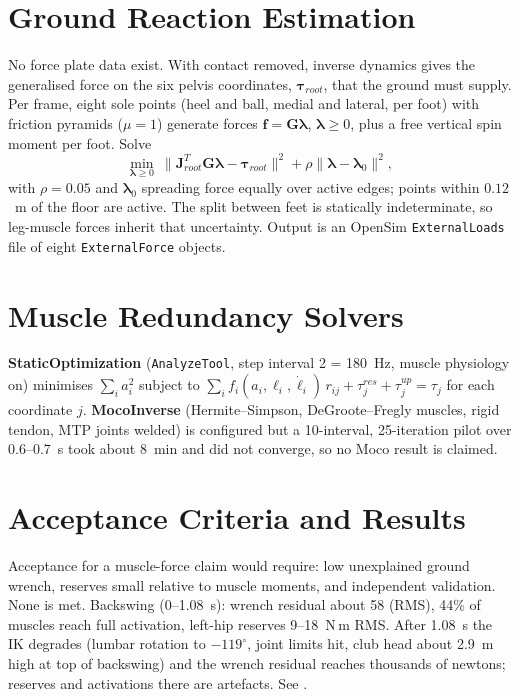 \documentclass[11pt,a4paper]{article}
\begin{document}
\section{Ground Reaction Estimation}
No force plate data exist. With contact removed, inverse dynamics gives the generalised force on the six pelvis coordinates, $\boldsymbol\tau_{root}$, that the ground must supply. Per frame, eight sole points (heel and ball, medial and lateral, per foot) with friction pyramids ($\mu=1$) generate forces $\mathbf{f}=\mathbf{G}\boldsymbol\lambda$, $\boldsymbol\lambda\ge0$, plus a free vertical spin moment per foot. Solve
\[
\min_{\boldsymbol\lambda\ge0}\ \lVert \mathbf{J}_{root}^{T}\mathbf{G}\boldsymbol\lambda-\boldsymbol\tau_{root}\rVert^2+\rho\lVert\boldsymbol\lambda-\boldsymbol\lambda_0\rVert^2,
\]
with $\rho=0.05$ and $\boldsymbol\lambda_0$ spreading force equally over active edges; points within $0.12$~m of the floor are active. The split between feet is statically indeterminate, so leg-muscle forces inherit that uncertainty. Output is an OpenSim \texttt{ExternalLoads} file of eight \texttt{ExternalForce} objects.

\section{Muscle Redundancy Solvers}
\textbf{StaticOptimization} (\texttt{AnalyzeTool}, step interval 2 = 180~Hz, muscle physiology on) minimises $\sum_i a_i^2$ subject to $\sum_i f_i(a_i,\ell_i,\dot\ell_i)\,r_{ij} + \tau^{res}_j + \tau^{up}_j = \tau_j$ for each coordinate $j$. \textbf{MocoInverse} (Hermite--Simpson, DeGroote--Fregly muscles, rigid tendon, MTP joints welded) is configured but a 10-interval, 25-iteration pilot over 0.6--0.7~s took about 8~min and did not converge, so no Moco result is claimed.

\section{Acceptance Criteria and Results}
Acceptance for a muscle-force claim would require: low unexplained ground wrench, reserves small relative to muscle moments, and independent validation. None is met. Backswing (0--1.08~s): wrench residual about 58 (RMS), 44\% of muscles reach full activation, left-hip reserves 9--18~N\,m RMS. After 1.08~s the IK degrades (lumbar rotation to $-119^\circ$, joint limits hit, club head about 2.9~m high at top of backswing) and the wrench residual reaches thousands of newtons; reserves and activations there are artefacts. See .
\end{document}
